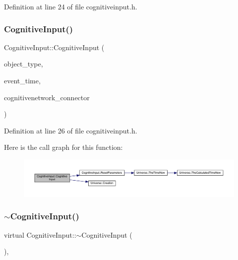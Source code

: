Definition at line 24 of file cognitiveinput.\+h.

\mbox{\label{class_cognitive_input_a230ebb8f019af7e0bff51c13bc10c580}} 
\subsubsection{\texorpdfstring{Cognitive\+Input()}{CognitiveInput()}\hspace{0.1cm}{\footnotesize\ttfamily [4/4]}}
{\footnotesize\ttfamily Cognitive\+Input\+::\+Cognitive\+Input (\begin{DoxyParamCaption}\item[{unsigned int}]{object\+\_\+type,  }\item[{std\+::chrono\+::time\+\_\+point$<$ \mbox{\hyperlink{universe_8h_a0ef8d951d1ca5ab3cfaf7ab4c7a6fd80}{Clock}} $>$}]{event\+\_\+time,  }\item[{\mbox{\hyperlink{class_cognitive_network}{Cognitive\+Network}} \&}]{cognitivenetwork\+\_\+connector }\end{DoxyParamCaption})\hspace{0.3cm}{\ttfamily [inline]}}



Definition at line 26 of file cognitiveinput.\+h.

Here is the call graph for this function\+:\nopagebreak
\begin{figure}[H]
\begin{center}
\leavevmode
\includegraphics[width=350pt]{class_cognitive_input_a230ebb8f019af7e0bff51c13bc10c580_cgraph}
\end{center}
\end{figure}
\mbox{\label{class_cognitive_input_a68007661b8fdd7ef39213a1fb3c06bd7}} 
\subsubsection{\texorpdfstring{$\sim$\+Cognitive\+Input()}{~CognitiveInput()}}
{\footnotesize\ttfamily virtual Cognitive\+Input\+::$\sim$\+Cognitive\+Input (\begin{DoxyParamCaption}{ }\end{DoxyParamCaption})\hspace{0.3cm}{\ttfamily [inline]}, {\ttfamily [virtual]}}

